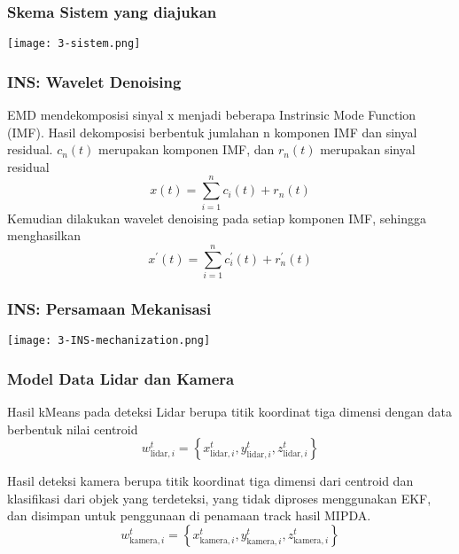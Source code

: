 \begin{frame}
    \frametitle{Skema Sistem yang diajukan}
    \begin{center}
        \texttt{[image: 3-sistem.png]}
    \end{center}
\end{frame}


\begin{frame}
    \frametitle{INS: Wavelet Denoising}
    EMD mendekomposisi sinyal x menjadi beberapa Instrinsic Mode Function (IMF). Hasil dekomposisi berbentuk jumlahan n komponen IMF dan sinyal residual. $c_n(t)$ merupakan komponen IMF, dan $r_n(t)$ merupakan sinyal residual
    \begin{equation}
        x(t)=\sum_{i=1}^{n} c_{i}(t)+r_{n}(t)
    \end{equation}
    Kemudian dilakukan wavelet denoising pada setiap komponen IMF, sehingga menghasilkan
    \begin{equation}
        x^{\prime}(t)=\sum_{i=1}^{n} c_{i}^{\prime}(t)+r_{n}^{\prime}(t)
        \label{eq: 4-PRE-denoised-x}
    \end{equation}
\end{frame}


\begin{frame}
    \frametitle{INS: Persamaan Mekanisasi}
    \begin{center}
        \texttt{[image: 3-INS-mechanization.png]}
    \end{center}
\end{frame}


\begin{frame}
    \frametitle{Model Data Lidar dan Kamera}
    Hasil kMeans pada deteksi Lidar berupa titik koordinat tiga dimensi dengan data berbentuk nilai centroid
    \begin{equation}
        w_{\text{lidar},i}^{t}=\left\{x_{\text{lidar}, i}^{t}, y_{\text{lidar}, i}^{t}, z_{\text{lidar},i}^{t}\right\}
    \end{equation}
    
    \vspace{2em}

    Hasil deteksi kamera berupa titik koordinat tiga dimensi dari centroid dan klasifikasi dari objek yang terdeteksi, yang tidak diproses menggunakan EKF, dan disimpan untuk penggunaan di penamaan track hasil MIPDA.
    \begin{equation}
        w_{\text{kamera},i}^{t}=\left\{x_{\text{kamera}, i}^{t}, y_{\text{kamera}, i}^{t}, z_{\text{kamera},i}^{t}\right\}
    \end{equation}
\end{frame}


